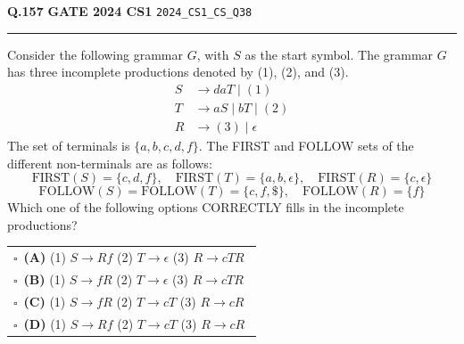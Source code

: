 \documentclass[a4paper,10pt]{article}
\begin{document}
\begin{tcolorbox}[
    blanker,
    sidebyside,
    sidebyside align=top,
    lefthand width=0.55\textwidth,
    top=4pt, bottom=4pt, left=0pt, right=0pt,
    middle=16pt,
    underlay={
        \draw[dashed, black!80, line width=0.8pt, dash pattern=on 4pt off 3pt]
            ([xshift=0.55\textwidth+8pt]frame.north west) --
            ([xshift=0.55\textwidth+8pt]frame.south west);
    }
]
\textbf{Q.157}  \hfill {\footnotesize\textbf{GATE 2024 CS1} \quad \tiny\texttt{2024\_CS1\_CS\_Q38}}
\vspace{2pt}\hrule height 0.3pt\vspace{4pt}

Consider the following grammar $G$, with $S$ as the start symbol. The grammar $G$ has three incomplete productions denoted by (1), (2), and (3).
\begin{align*}
S &\to daT \mid (1) \\
T &\to aS \mid bT \mid (2) \\
R &\to (3) \mid \epsilon
\end{align*}
The set of terminals is $\{a, b, c, d, f\}$. The FIRST and FOLLOW sets of the different non-terminals are as follows:
$$\text{FIRST}(S) = \{c, d, f\}, \quad \text{FIRST}(T) = \{a, b, \epsilon\}, \quad \text{FIRST}(R) = \{c, \epsilon\}$$
$$\text{FOLLOW}(S) = \text{FOLLOW}(T) = \{c, f, \$\}, \quad \text{FOLLOW}(R) = \{f\}$$
Which one of the following options CORRECTLY fills in the incomplete productions?

\par\vspace{6pt}\noindent
\begin{tabular}{@{}p{0.98\linewidth}@{}}
$\square$\ \textbf{(A)} (1) $S \to Rf$ (2) $T \to \epsilon$ (3) $R \to cTR$ \\
\addlinespace[3pt]
$\square$\ \textbf{(B)} (1) $S \to fR$ (2) $T \to \epsilon$ (3) $R \to cTR$ \\
\addlinespace[3pt]
$\square$\ \textbf{(C)} (1) $S \to fR$ (2) $T \to cT$ (3) $R \to cR$ \\
\addlinespace[3pt]
$\square$\ \textbf{(D)} (1) $S \to Rf$ (2) $T \to cT$ (3) $R \to cR$
\end{tabular}

\tcblower


\end{tcolorbox}
\end{document}
